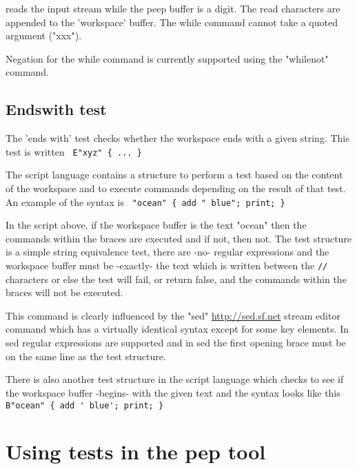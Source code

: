 \documentclass[a4paper,12pt]{article}
\begin{document}
  reads the input stream while the peep buffer is a digit.
  The read characters are appended to the 'workspace' buffer.
  The while command cannot take a quoted argument ("xxx").

  Negation for the while command is currently supported
  using the "whilenot" command.

\subsection{Endswith test}

  The 'ends with' test checks whether the workspace ends
  with a given string. This test is written 
 \verb| E"xyz" { ... } |


 The script language contains a structure to perform a
 test based on the content of the workspace and to
 execute commands depending on the result of that test.
 An example of the syntax is 
 \verb| "ocean" { add " blue"; print; } |


 In the script above, if the workspace buffer is the text "ocean" then the
 commands within the braces are executed and if not, then not. The test
 structure is a simple string equivalence test, there are -no- regular
 expressions and the workspace buffer must be -exactly- the text which is
 written between the \texttt{//} characters or else the test will fail, or return
 false, and the commands within the braces will not be executed.

 This command is clearly influenced by the "sed" \url{http://sed.sf.net}
 stream editor command which has a virtually identical syntax
 except for some key elements. In sed regular expressions are
 supported and in sed the first opening brace must be on the
 same line as the test structure.

 There is also another test structure in the script language
 which checks to see if the workspace buffer -begins- with the
 given text and the syntax looks like this 
 \verb| B"ocean" { add ' blue'; print; } |


\section{Using tests in the pep tool}
 
\end{document}
